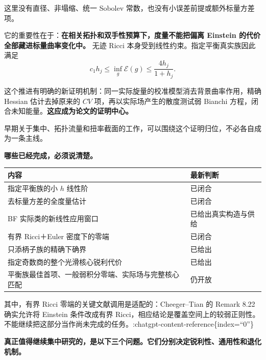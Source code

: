 \documentclass[
  10pt,
]{article}
\begin{document}
这里没有直径、非塌缩、统一 Sobolev
常数，也没有小误差前提或额外标量方差项。

它的重要性在于：\textbf{在相关拓扑和双手性预算下，度量不能把偏离
Einstein 的代价全部藏进标量曲率变化中。} 无迹 Ricci
本身受到线性约束。指定平衡真实族因此满足 \[
\boxed{c_1h_j\le\inf_g\mathcal E(g)\le\frac{4h_j}{1+h_j}.}
\]

这个推进有明确的新证明机制：同一实际旋量的校准模型消去背景曲率作用，精确
Hessian 估计去掉原来的 \(CV\) 项，再以实际场产生的散度测试弱 Bianchi
方程，闭合未知能量。\textbf{这应成为论文的证明中心。}

早期关于集中、拓扑流量和扭率截面的工作，可以围绕这个证明归位，不必各自成为一条主线。

\textbf{哪些已经完成，必须说清楚。}

\begin{longtable}[]{@{}>{\raggedright\arraybackslash}p{\dimexpr(\linewidth-2\tabcolsep)/2\relax}>{\raggedright\arraybackslash}p{\dimexpr(\linewidth-2\tabcolsep)/2\relax}@{}}
\toprule
内容 & 最新判断\tabularnewline
\midrule
\endhead
指定平衡族的小 \(h\) 线性阶 & 已闭合\tabularnewline
去标量方差的全度量估计 & 已闭合\tabularnewline
BF 实际类的新线性应用窗口 & 已给出真实构造与供给\tabularnewline
有界 Ricci＋Euler 密度下的零端 & 已闭合\tabularnewline
只添柄子族的精确下确界 & 已给出\tabularnewline
指定奇数商的整个光滑核心锐利代价 & 已给出\tabularnewline
平衡族最佳首项、一般弱积分零端、实际场与完整核心匹配 &
仍开放\tabularnewline
\bottomrule
\end{longtable}

其中，有界 Ricci 零端的关键文献调用是适配的：Cheeger--Tian 的 Remark
8.22 确实允许将 Einstein 条件改成有界
Ricci，相应结论是覆盖空间上的较弱正则性。不能继续把这部分当作尚未完成的任务。:chatgpt-content-reference\{index=``0''\}

\textbf{真正值得继续集中研究的，是以下三个问题。它们分别决定锐利性、通用性和退化机制。}
\end{document}
